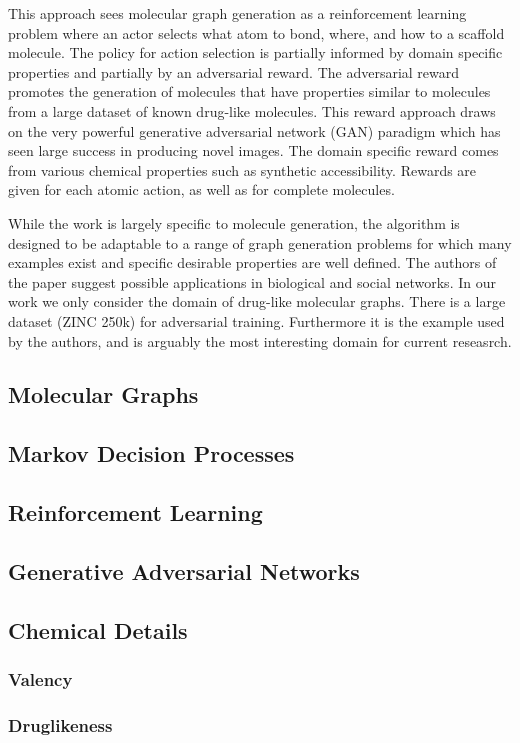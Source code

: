 \documentclass{article}
\begin{document}
This approach sees molecular graph generation as a reinforcement learning problem where an actor selects what atom to bond, where, and how to a scaffold molecule. The policy for action selection is partially informed by domain specific properties and partially by an adversarial reward. The adversarial reward promotes the generation of molecules that have properties similar to molecules from a large dataset of known drug-like molecules. This reward approach draws on the very powerful generative adversarial network (GAN) paradigm which has seen large success in producing novel images. The domain specific reward comes from various chemical properties such as synthetic accessibility. Rewards are given for each atomic action, as well as for complete molecules.

While the work is largely specific to molecule generation, the algorithm is designed to be adaptable to a range of graph generation problems for which many examples exist and specific desirable properties are well defined. The authors of the paper suggest possible applications in biological and social networks.
In our work we only consider the domain of drug-like molecular graphs. There is a large dataset (ZINC 250k) for adversarial training. Furthermore it is the example used by the authors, and is arguably the most interesting domain for current reseasrch.
\subsection{Molecular Graphs}
\subsection{Markov Decision Processes}
\subsection{Reinforcement Learning}
\subsection{Generative Adversarial Networks}
\subsection{Chemical Details}
\subsubsection*{Valency}
\subsubsection*{Druglikeness}
\end{document}
